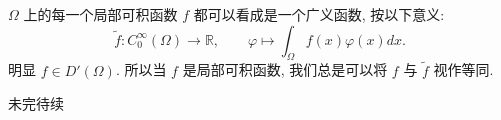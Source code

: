 \begin{example}{}
$\Omega$ 上的每一个局部可积函数 $f$ 都可以看成是一个广义函数, 按以下意义: 
\[
\tilde{f}:C_{0}^{\infty}(\Omega)\rightarrow\mathbb{R},\quad\quad\varphi\mapsto{\displaystyle \int_{\Omega}f(x)\varphi(x)dx}.
\]
明显 $f\in D'(\Omega)$. 所以当 $f$ 是局部可积函数, 我们总是可以将 $f$ 与 $\tilde{f}$
视作等同. 
\end{example}

未完待续